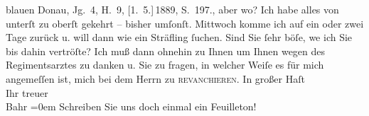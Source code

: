 \begin{ledgroupsized}[t]{13cm}
{{{{                        blauen Donau}, Jg. 4, H. 9, {[}1. 5.{]} 1889,
                  S. 197.}}}\label{K_L00252_2h}, aber wo? Ich habe alles von unterſt zu oberſt gekehrt –
               bisher umſonſt. Mittwoch komme ich {\pb}auf ein oder
               zwei Tage zurück u. will dann wie ein Sträfling ſuchen. Sind Sie ſehr böſe, we{\geminationn} ich Sie bis dahin vertröſte?\pend
           \pstart
           Ich muß dann ohnehin zu Ihnen um Ihnen wegen des Regimentsarztes zu danken u. Sie zu fragen, in welcher
               Weiſe es für mich angemeſſen ist, mich bei dem Herrn zu \textsc{revan{\pb}chieren}.\pend
           \pstart
           In großer Haſt{\\[\baselineskip]}Ihr treuer{\\[\baselineskip]}\spacefill\mbox{Bahr}\pend
           \leftskip=0em{}\pstart
           \noindent{}Schreiben Sie uns doch einmal ein Feuilleton!\pend
           
         
         \endnumbering{}\end{ledgroupsized}  \newcommand{\dateiname}{L00252}\newcommand{\titel}{Hermann Bahr an Arthur Schnitzler, [12. 8. 1893]}\newcommand{\editorInnen}{ Kurt Ifkovits,  Martin Anton Müller}
      